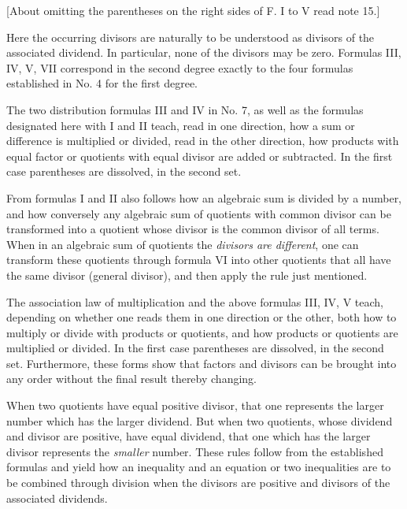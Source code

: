 \thispagestyle{fancy}

\vspace{0.5cm}

[About omitting the parentheses on the right sides of F. I to V read note 15.]

Here the occurring divisors are naturally to be understood as divisors of the associated dividend. In particular, none of the divisors may be zero. Formulas III, IV, V, VII correspond in the second degree exactly to the four formulas established in No. 4 for the first degree.

The two distribution formulas III and IV in No. 7, as well as the formulas designated here with I and II teach, read in one direction, how a sum or difference is multiplied or divided, read in the other direction, how products with equal factor or quotients with equal divisor are added or subtracted. In the first case parentheses are dissolved, in the second set.

From formulas I and II also follows how an algebraic sum is divided by a number, and how conversely any algebraic sum of quotients with common divisor can be transformed into a quotient whose divisor is the common divisor of all terms. When in an algebraic sum of quotients the \textit{divisors are different}, one can transform these quotients through formula VI into other quotients that all have the same divisor (general divisor), and then apply the rule just mentioned.

The association law of multiplication and the above formulas III, IV, V teach, depending on whether one reads them in one direction or the other, both how to multiply or divide with products or quotients, and how products or quotients are multiplied or divided. In the first case parentheses are dissolved, in the second set. Furthermore, these forms show that factors and divisors can be brought into any order without the final result thereby changing.

When two quotients have equal positive divisor, that one represents the larger number which has the larger dividend. But when two quotients, whose dividend and divisor are positive, have equal dividend, that one which has the larger divisor represents the \textit{smaller} number. These rules follow from the established formulas and yield how an inequality and an equation or two inequalities are to be combined through division when the divisors are positive and divisors of the associated dividends.
